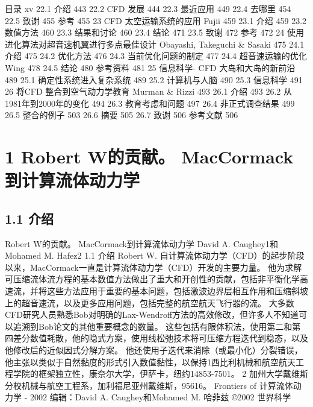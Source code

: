 \documentclass[UTF8,11pt,a4paper,openany,fontset=fandol]{ctexbook}
\begin{document}
目录 xv 22.1 介绍 443 22.2 CFD 发展 444 22.3 最近应用 449 22.4 去哪里 454 22.5 致谢 455 参考 455 23 CFD 太空运输系统的应用 Fujii 459 23.1 介绍 459 23.2 数值方法 460 23.3 结果和讨论 460 23.4 结论 471 23.5 致谢 472 参考 472 24 使用进化算法对超音速机翼进行多点最佳设计 Obayashi, Takeguchi \& Sasaki 475 24.1 介绍 475 24.2 优化方法 476 24.3 当前优化问题的制定 477 24.4 超音速运输的优化 Wing 478 24.5 结论 480 参考资料 481 25 信息科学- CFD 大岛和大岛的新前沿 489 25.1 确定性系统进入复杂系统 489 25.2 计算机与人脑 490 25.3 信息科学 491 26 将CFD 整合到空气动力学教育 Murman \& Rizzi 493 26.1 介绍 493 26.2 从1981年到2000年的变化 494 26.3 教育考虑和问题 497 26.4 非正式调查结果 499 26.5 整合的例子 503 26.6 摘要 505 26.7 致谢 506 参考文献 506

\clearpage
\chapter{1 Robert W的贡献。 MacCormack到计算流体动力学}
\section{1.1 介绍}
Robert W的贡献。 MacCormack到计算流体动力学 David A. Caughey1和Mohamed M. Hafez2 1.1 介绍 Robert W. 自计算流体动力学（CFD）的起步阶段以来，MacCormack一直是计算流体动力学（CFD）开发的主要力量。 他为求解可压缩流体流方程的基本数值方法做出了重大和开创性的贡献，包括非平衡化学高速流，并将这些方法应用于重要的基本问题，包括激波边界层相互作用和压缩斜坡上的超音速流，以及更多应用问题，包括完整的航空航天飞行器的流。 大多数CFD研究人员熟悉Bob对明确的Lax-Wendroff方法的高效修改，但许多人不知道可以追溯到Bob论文的其他重要概念的数量。 这些包括有限体积法，使用第二和第四差分数值耗散，他的隐式方案，使用线松弛技术将可压缩方程迭代到稳态，以及他修改后的近似因式分解方案。 他还使用子迭代来消除（或最小化）分裂错误，他主张以类似于自然黏度的形式引入数值黏性，以保持1西比利机械和航空航天工程学院的框架独立性，康奈尔大学，伊萨卡，纽约14853-7501。 2 加州大学戴维斯分校机械与航空工程系，加利福尼亚州戴维斯，95616。 Frontiers of 计算流体动力学 - 2002 编辑：David A. Caughey和Mohamed M. 哈菲兹 ©2002 世界科学
\end{document}
